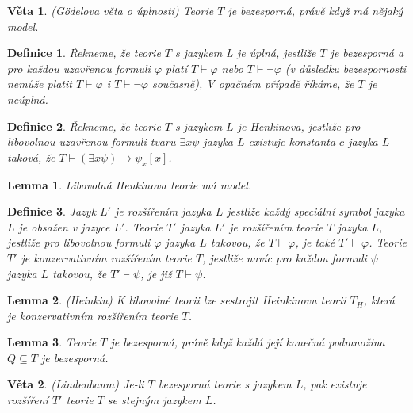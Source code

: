 \documentclass[a4paper, 11pt]{report}
\newtheorem{mydef}{Definice}[chapter]
\newtheorem{veta}{Věta}
\newtheorem{lemma}{Lemma}
\begin{document}
\begin{veta}
(Gödelova věta o úplnosti) Teorie $T$ je bezesporná, právě když má nějaký model.
\end{veta}

\begin{mydef}
Řekneme, že teorie $T$ s jazykem L je \emph{úplná}, jestliže $T$ je bezesporná a pro každou uzavřenou formuli $\varphi$ platí $T \vdash \varphi$ nebo $T \vdash \lnot \varphi$ (v důsledku bezespornosti nemůže platit $T \vdash \varphi$ i $T \vdash \lnot \varphi$ současně), V opačném případě říkáme, že $T$ je \emph{neúplná}.
\end{mydef}

\begin{mydef}
Řekneme, že teorie $T$ s jazykem $L$ je \emph{Henkinova}, jestliže pro libovolnou uzavřenou formuli tvaru $\exists x \psi$ jazyka $L$ existuje konstanta $c$ jazyka $L$ taková, že $T \vdash (\exists x \psi) \to \psi_x[x]$.
\end{mydef}

\begin{lemma}
Libovolná Henkinova teorie má model.
\end{lemma}

\begin{mydef}
Jazyk $L'$ je rozšířením jazyka $L$ jestliže každý speciální symbol jazyka $L$ je obsažen v jazyce $L'$. Teorie $T'$ jazyka $L'$ je rozšířením teorie $T$ jazyka $L$, jestliže pro libovolnou formuli $\varphi$ jazyka $L$ takovou, že $T \vdash \varphi$, je také $T' \vdash \varphi$. Teorie $T'$ je konzervativním rozšířením teorie $T$, jestliže  navíc pro každou formuli $\psi$ jazyka $L$ takovou, že $T' \vdash \psi$, je již $T \vdash \psi$.
\end{mydef}

\begin{lemma}
(Heinkin) K libovolné teorii lze sestrojit Heinkinovu teorii $T_H$, která je konzervativním rozšířením teorie $T$.
\end{lemma}

\begin{lemma}
Teorie $T$ je bezesporná, právě když každá její konečná podmnožina $Q \subseteq T$ je bezesporná.
\end{lemma}

\begin{veta}
(Lindenbaum) Je-li $T$ bezesporná teorie s jazykem $L$, pak existuje rozšíření $T'$ teorie $T$ se stejným jazykem $L$.
\end{veta}
\end{document}
